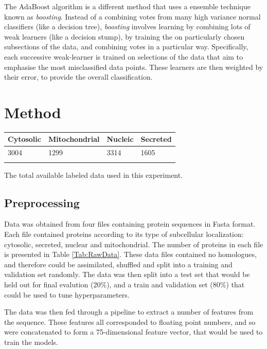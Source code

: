 \documentclass{bioinfo}
\begin{document}
The AdaBoost algorithm is a different method that uses a ensemble technique known as \textit{boosting}.
Instead of a combining votes from many high variance normal classifiers (like a decision tree), \textit{boosting} involves learning by combining lots of weak learners (like a decision stump), by training the on particularly chosen subsections of the data, and combining votes in a particular way. 
Specifically, each successive weak-learner is trained on selections of the data that aim to emphasise the most misclassified data points. 
These learners are then weighted by their error, to provide the overall classification.





\section{Method}

\begin{table}[!t]
 {\begin{tabular}{@{}llll@{}}\toprule Cytosolic &Mitochondrial &Nucleic & Secreted  \\\midrule
3004 & 1299 & 3314 & 1605\\\botrule
\end{tabular}}{The total available labeled data used in this experiment.}
\end{table}

\subsection{Preprocessing}

Data was obtained from four files containing protein sequences in Fasta format. 
Each file contained proteins according to its type of subcellular localization: cytosolic, secreted, nuclear and mitochondrial. 
The number of proteins in each file is presented in Table \ref{Tab:RawData}. 
These data files contained no homologues, and therefore could be assimilated, shuffled and split into a training and validation set randomly. 
The data was then split into a test set that would be held out for final evalution (20\%), and a train and validation set (80\%) that could be used to tune hyperparameters. 

The data was then fed through a pipeline to extract a number of features from the sequence.
These features all corresponded to floating point numbers, and so were concatenated to form a 75-dimensional feature vector, that would be used to train the models. 
\end{document}
